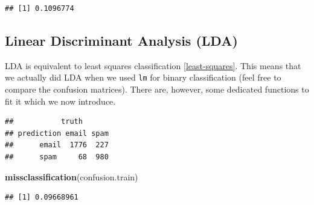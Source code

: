 \documentclass[]{book}
\newenvironment{Shaded}{\begin{snugshade}}{\end{snugshade}}
\newcommand{\KeywordTok}[1]{\textcolor[rgb]{0.13,0.29,0.53}{\textbf{#1}}}
\newcommand{\DataTypeTok}[1]{\textcolor[rgb]{0.13,0.29,0.53}{#1}}
\newcommand{\DecValTok}[1]{\textcolor[rgb]{0.00,0.00,0.81}{#1}}
\newcommand{\StringTok}[1]{\textcolor[rgb]{0.31,0.60,0.02}{#1}}
\newcommand{\CommentTok}[1]{\textcolor[rgb]{0.56,0.35,0.01}{\textit{#1}}}
\newcommand{\OperatorTok}[1]{\textcolor[rgb]{0.81,0.36,0.00}{\textbf{#1}}}
\newcommand{\NormalTok}[1]{#1}
\theoremstyle{definition}
\theoremstyle{definition}
\theoremstyle{definition}
\theoremstyle{remark}
\begin{document}
\begin{verbatim}
## [1] 0.1096774
\end{verbatim}

\subsection{Linear Discriminant Analysis
(LDA)}\label{linear-discriminant-analysis-lda}

LDA is equivalent to least squares classification \ref{least-squares}.
This means that we actually did LDA when we used \texttt{lm} for binary
classification (feel free to compare the confusion matrices). There are,
however, some dedicated functions to fit it which we now introduce.

\begin{Shaded}
\end{Shaded}

\begin{verbatim}
##           truth
## prediction email spam
##      email  1776  227
##      spam     68  980
\end{verbatim}

\begin{Shaded}
\begin{Highlighting}[]
\KeywordTok{missclassification}\NormalTok{(confusion.train)}
\end{Highlighting}
\end{Shaded}

\begin{verbatim}
## [1] 0.09668961
\end{verbatim}

\begin{Shaded}
\end{Shaded}
\end{document}
